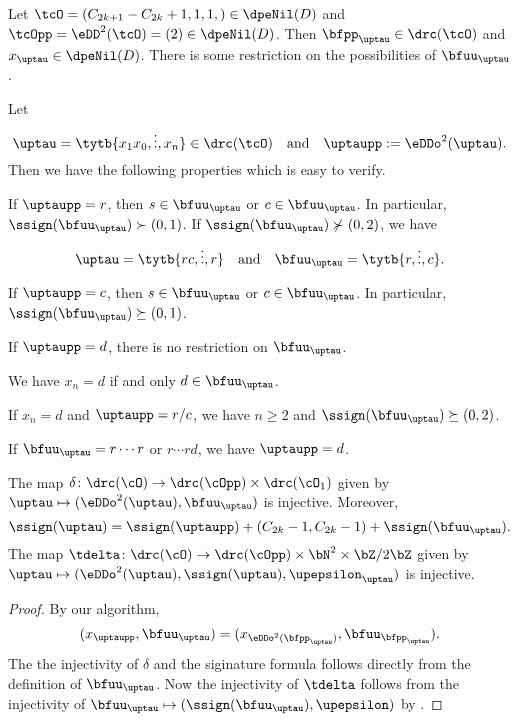 \documentclass[ssunip]{subfiles}
\begin{document}
Let $\tcO = (C_{2k+1}-C_{2k}+1,1,1,)\in \dpeNil(D)$ and
$\tcOpp = \eDD^{2}(\tcO) = (2)\in \dpeNil(D)$. Then
$\bfpp_{\uptau}\in \drc(\tcO)$ and $x_{\uptau}\in\dpeNil(D)$.
There is some restriction on the possibilities  of $\bfuu_{\uptau}$.

\begin{lem}\label{lem:u}
  Let
  \[
    \uptau = \tytb{{x_{1}}{x_{0}},\vdots, {x_{n}}}\in \drc(\tcO)
    \quad \text{and}\quad \uptaupp:=\eDDo^{2}(\uptau).
  \]
  Then we have the following properties which is easy to verify.
  \begin{enumS}
    \item  If $\uptaupp = r$, then $s \in \bfuu_{\uptau}$ or
    $c \in \bfuu_{\uptau}$. In particular, $\ssign(\bfuu_{\uptau})\succ (0,1)$.
    If $\ssign(\bfuu_{\uptau})\nsucc (0,2)$, we have
    \[
      \uptau = \tytb{rc, \vdots,r} \quad \text{and}\quad  \bfuu_{\uptau} = \tytb{r,\vdots,c}.
    \]
    \item  If $\uptaupp = c$, then $s \in \bfuu_{\uptau}$ or
    $c \in \bfuu_{\uptau}$. In particular, $\ssign(\bfuu_{\uptau})\succeq (0,1)$.
    \item If $\uptaupp = d$, there is no restriction on $\bfuu_{\uptau}$.
    \item  We have $x_{n}=d$ if and only $d\in \bfuu_{\uptau}$.
    \item If $x_{n}=d$ and $\uptaupp =r/c$,  we have $n\geq 2$ and
    $\ssign(\bfuu_{\uptau})\succeq (0,2)$.
    \item If $\bfuu_{\uptau} = r\cdots r$ or $r\cdots rd$, we have $\uptaupp=d$.\qedhere
  \end{enumS}

\end{lem}


\begin{lem}\label{lem:gd.inj}
  The map $\delta\colon  \drc(\cO)\rightarrow \drc(\cOpp) \times \drc(\cO_{1})$
  given by $\uptau\mapsto (\eDDo^{2}(\uptau),\bfuu_{\uptau})$ is injective.
  Moreover,
  \[
  \ssign(\uptau) =\ssign(\uptaupp) + (C_{2k}-1, C_{2k}-1)+\ssign(\bfuu_{\uptau}).
  \]
  The map $\tdelta\colon \drc(\cO)\rightarrow \drc(\cOpp) \times \bN^{2}\times \bZ/2\bZ$
  given by $\uptau\mapsto (\eDDo^{2}(\uptau), \ssign(\uptau),\upepsilon_{\uptau})$ is injective.
\end{lem}
\begin{proof}
  By our algorithm,
  \[
    (x_{\uptaupp},\bfuu_{\uptau}) = (x_{\eDDo^{2}(\bfpp_{\uptau})}, \bfuu_{\bfpp_{\uptau}}).
  \]
  The the injectivity of $\delta$ and the siginature formula follows directly
  from the definition of $\bfuu_{\uptau}$.
  Now the injectivity of $\tdelta$ follows from the injectivity of
  $\bfuu_{\uptau}\mapsto (\ssign(\bfuu_{\uptau}), \upepsilon)$ by
  .
\end{proof}
\end{document}
